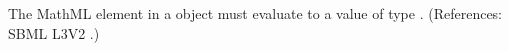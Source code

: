 The MathML  element in a \Constraint object must evaluate to a
value of type .  (References: SBML L3V2
.)
